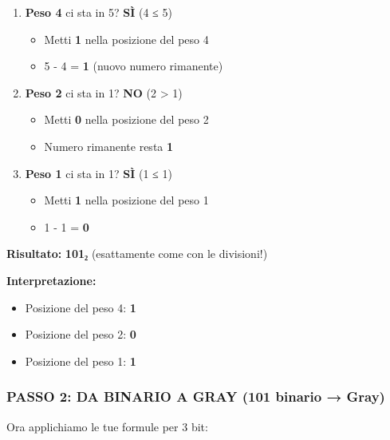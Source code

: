 \documentclass[
]{article}
\providecommand{\tightlist}{%
  \setlength{\itemsep}{0pt}\setlength{\parskip}{0pt}}
\begin{document}
\begin{enumerate}
\def\labelenumi{\arabic{enumi}.}
\tightlist
\item
  \textbf{Peso 4} ci sta in 5? \textbf{SÌ} (4 ≤ 5)

  \begin{itemize}
  \tightlist
  \item
    Metti \textbf{1} nella posizione del peso 4
  \item
    5 - 4 = \textbf{1} (nuovo numero rimanente)
  \end{itemize}
\item
  \textbf{Peso 2} ci sta in 1? \textbf{NO} (2 \textgreater{} 1)

  \begin{itemize}
  \tightlist
  \item
    Metti \textbf{0} nella posizione del peso 2
  \item
    Numero rimanente resta \textbf{1}
  \end{itemize}
\item
  \textbf{Peso 1} ci sta in 1? \textbf{SÌ} (1 ≤ 1)

  \begin{itemize}
  \tightlist
  \item
    Metti \textbf{1} nella posizione del peso 1
  \item
    1 - 1 = \textbf{0}
  \end{itemize}
\end{enumerate}

\textbf{Risultato:} \textbf{101₂} (esattamente come con le divisioni!)

\textbf{Interpretazione:}

\begin{itemize}
\tightlist
\item
  Posizione del peso 4: \textbf{1}
\item
  Posizione del peso 2: \textbf{0}
\item
  Posizione del peso 1: \textbf{1}
\end{itemize}

\hypertarget{passo-2-da-binario-a-gray-101-binario-gray}{%
\subsubsection{\texorpdfstring{\textbf{PASSO 2: DA BINARIO A GRAY (101 binario → Gray)}}{PASSO 2: DA BINARIO A GRAY (101 binario → Gray)}}\label{passo-2-da-binario-a-gray-101-binario-gray}}

Ora applichiamo le tue formule per 3 bit:
\end{document}
